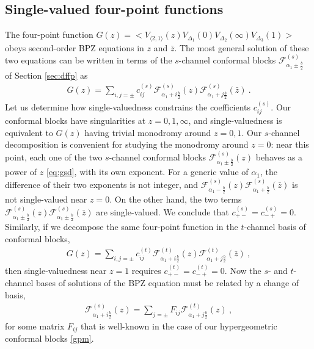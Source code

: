\documentclass[12pt, a4paper]{article}
\theoremstyle{break}
\begin{document}
\subsection{Single-valued four-point functions}

The four-point function $G(z) = \Big< V_{\langle 2, 1 \rangle}(z) V_{\Delta_1}(0)V_{\Delta_2}(\infty)V_{\Delta_3}(1) \Big>$ obeys second-order BPZ equations in $z$ and $\bar z$. The most general solution of these two equations can be written in terms of the $s$-channel conformal blocks $\mathcal{F}^{(s)}_{\alpha_1\pm\frac{b}{2}}$ of Section \ref{sec:dffp} as
\begin{align}
 G(z) = \sum_{i,j=\pm} c^{(s)}_{ij} \mathcal{F}^{(s)}_{\alpha_1+i\frac{b}{2}}(z) \mathcal{F}^{(s)}_{\alpha_1+j\frac{b}{2}}(\bar z)\ .
 \label{gzs}
\end{align}
Let us determine how single-valuedness constrains the coefficients $c^{(s)}_{ij}$. 
Our conformal blocks have singularities at $z=0,1,\infty$, and single-valuedness is equivalent to $G(z)$ having trivial monodromy around $z=0,1$. 
Our $s$-channel decomposition is convenient for studying the monodromy around $z=0$: near this point, each one of the two $s$-channel conformal blocks $\mathcal{F}^{(s)}_{\alpha_1\pm\frac{b}{2}}(z)$ behaves as a power of $z$ \eqref{eq:gsd}, with its own exponent. For a generic value of $\alpha_1$, the difference of their two exponents is not integer, and $\mathcal{F}^{(s)}_{\alpha_1-\frac{b}{2}}(z) \mathcal{F}^{(s)}_{\alpha_1+\frac{b}{2}}(\bar z)$ is not single-valued near $z=0$. On the other hand, the two terms $\mathcal{F}^{(s)}_{\alpha_1\pm\frac{b}{2}}(z) \mathcal{F}^{(s)}_{\alpha_1\pm\frac{b}{2}}(\bar z)$ are single-valued. We conclude that $c^{(s)}_{+-} = c^{(s)}_{-+}=0$. Similarly, if we decompose the same four-point function in the $t$-channel basis of conformal blocks,
\begin{align}
 G(z) = \sum_{i,j=\pm} c^{(t)}_{ij} \mathcal{F}^{(t)}_{\alpha_1+i\frac{b}{2}}(z) \mathcal{F}^{(t)}_{\alpha_1+j\frac{b}{2}}(\bar z)\ ,
\end{align}
then single-valuedness near $z=1$ requires $c^{(t)}_{+-}=c^{(t)}_{-+}=0$. 
Now the $s$- and $t$-channel bases of solutions of the BPZ equation must be related by a change of basis,
\begin{align}
 \mathcal{F}^{(s)}_{\alpha_1+i\frac{b}{2}}(z) = \sum_{j=\pm} F_{ij} \mathcal{F}^{(t)}_{\alpha_1+j\frac{b}{2}}(z) \ ,
\end{align}
for some matrix $F_{ij}$ that is well-known in the case of our hypergeometric conformal blocks \eqref{gpm}.
\end{document}
